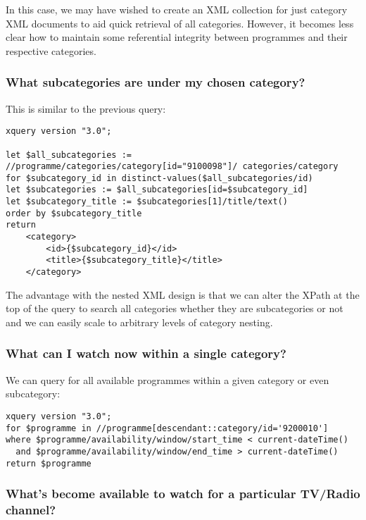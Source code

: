 \documentclass[11pt,a4paper]{article}
\begin{document}
In this case, we may have wished to create an XML collection for just
category XML documents to aid quick retrieval of all categories. However,
it becomes less clear how to maintain some referential integrity
between programmes and their respective categories.

\subsubsection{What subcategories are under my chosen category?}

This is similar to the previous query:

\begin{lstlisting}
xquery version "3.0";

let $all_subcategories := //programme/categories/category[id="9100098"]/ categories/category
for $subcategory_id in distinct-values($all_subcategories/id)
let $subcategories := $all_subcategories[id=$subcategory_id]
let $subcategory_title := $subcategories[1]/title/text()
order by $subcategory_title
return 
    <category>
        <id>{$subcategory_id}</id>
        <title>{$subcategory_title}</title>
    </category>
\end{lstlisting}

The advantage with the nested XML design is that we can alter the XPath at
the top of the query to search all categories whether they are subcategories
or not and we can easily scale to arbitrary levels of category nesting.

\subsubsection{What can I watch now within a single category?}

We can query for all available programmes within a given category or even subcategory:

\begin{lstlisting}
xquery version "3.0";
for $programme in //programme[descendant::category/id='9200010']
where $programme/availability/window/start_time < current-dateTime()
  and $programme/availability/window/end_time > current-dateTime()
return $programme
\end{lstlisting}

\subsubsection{What's become available to watch for a particular TV/Radio channel?}
\end{document}
